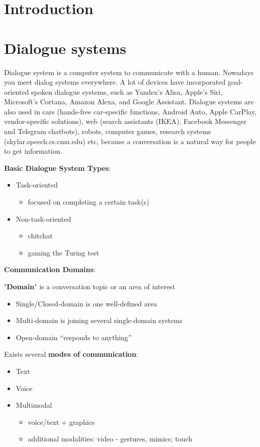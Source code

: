 \chapter{Introduction}\label{introduction}
\chapter{Dialogue systems}\label{dialogue systems}
Dialogue system is a computer system to communicate with a human. Nowadays you meet dialog systems everywhere. A lot of devices have incorporated goal-oriented spoken dialogue systems, such as  Yandex’s Alisa,  Apple’s Siri, Microsoft’s Cortana, Amazon Alexa, and Google Assistant. Dialogue systems are also used in cars (hands-free car-specific functions, Android Auto, Apple CarPlay, vendor-specific solutions), web (search assistants (IKEA), Facebook Messenger and Telegram chatbots), robots, computer games, research systems (skylar.speech.cs.cmu.edu) etc, because a conversation is a natural way for people to get information.

\textbf{Basic Dialogue System Types}:
\begin{itemize}
	\item Task-oriented 
		\begin{itemize}
			\item focused on completing a certain task(s)
		\end{itemize}
	\item Non-task-oriented
		\begin{itemize}
			\item chitchat
			\item gaming the Turing test
		\end{itemize}		
\end{itemize}

\textbf{Communication Domains}:

"\textbf{Domain}" is a conversation topic or an area of interest
\begin{itemize}
	\item Single/Closed-domain is one well-defined area
	\item Multi-domain is joining several single-domain systems
	\item Open-domain “responds to anything”
\end{itemize}


Exists several \textbf{modes of communication}:
\begin{itemize}
	\item Text
	\item Voice
	\item Multimodal
		\begin{itemize}
			\item voice/text + graphics
			\item additional modalities: video - gestures, mimics; touch
		\end{itemize}
\end{itemize}

